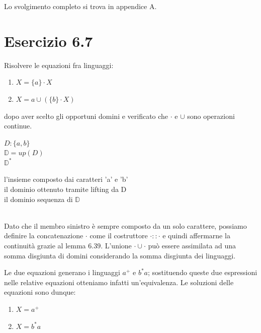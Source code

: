 		Lo svolgimento completo si trova in appendice A.
		
		\newpage
	
	\section{Esercizio 6.7}
		\qquad Risolvere le equazioni fra linguaggi:
		\begin{enumerate}
		  \item $X = \{a\} \cdot X$
		  \item $X = {a} \cup (\{b\} \cdot X)$
		\end{enumerate}
		dopo aver scelto gli opportuni domini e verificato che $\cdot$ e $\cup$ sono
		operazioni continue.
		
		\sectionline
		
		\begin{minipage}{0.2\linewidth}
			\begin{flushleft}
				$D:\{a,b\}$\\
				$\mathbb{D} = up(D)$\\
				$\mathbb{D}^*$
			\end{flushleft}
		\end{minipage}
		\hfill
		\begin{minipage}{0.7\linewidth}
			\begin{flushright}
				l'insieme composto dai caratteri 'a' e 'b'\\
				il dominio ottenuto tramite lifting da D\\
				il dominio sequenza di $\mathbb{D}$
			\end{flushright}
		\end{minipage}\\
		
		Dato che il membro sinistro \`e sempre composto da un solo carattere,
		possiamo definire la concatenazione $\cdot$ come il costruttore $\cdot ::
		\cdot$ e quindi affermarne la continuit\`a grazie al lemma $6.39$. L'unione
		$\cdot\cup\cdot$ pu\`{o} essere assimilata ad una somma disgiunta di domini
		considerando la somma disgiunta dei linguaggi.
		
		Le due equazioni generano i linguaggi $a^+$ e $b^*a$; sostituendo queste due
		espressioni nelle relative equazioni otteniamo infatti un'equivalenza. Le
		soluzioni delle equazioni sono dunque:
		
		\begin{enumerate}
		  \item $X = a^+$
		  \item $X = b^*a$
		\end{enumerate}
		
